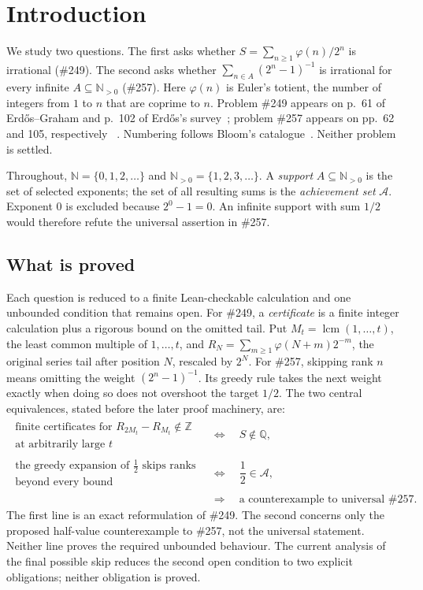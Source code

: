 \documentclass[11pt]{article}
\theoremstyle{definition}
\theoremstyle{remark}
\newcommand{\N}{\mathbb{N}}
\newcommand{\Npos}{\mathbb{N}_{>0}}
\newcommand{\Z}{\mathbb{Z}}
\newcommand{\Q}{\mathbb{Q}}
\newcommand{\ph}{\varphi}
\newcommand{\lcm}{\operatorname{lcm}}
\begin{document}
\section{Introduction}\label{sec:intro}

We study two questions.  The first asks whether
$S=\sum_{n\ge1}\ph(n)/2^n$ is irrational (\#249).  The second asks whether
$\sum_{n\in A}(2^n-1)^{-1}$ is irrational
for every infinite $A\subseteq\Npos$ (\#257).
Here \(\ph(n)\) is Euler's totient, the number
of integers from \(1\) to \(n\) that are coprime to \(n\).  Problem \#249
appears on p.~61 of Erd\H{o}s--Graham and p.~102 of Erd\H{o}s's
survey~\cite[p.~61]{erdosgraham1980}\cite[p.~102]{erdos1988}; problem
\#257 appears on pp.~62 and 105, respectively~\cite[p.~62]{erdosgraham1980}
\cite[p.~105]{erdos1988}.  Numbering follows Bloom's
catalogue~\cite{erdosproblems}.  Neither problem is settled.

Throughout, \(\N=\{0,1,2,\ldots\}\) and
\(\Npos=\{1,2,3,\ldots\}\).  A \emph{support} \(A\subseteq\Npos\)
is the set of selected exponents; the set of all resulting sums is the
\emph{achievement set} \(\mathcal A\).  Exponent \(0\) is excluded because
\(2^0-1=0\).  An infinite support with sum \(1/2\) would therefore refute
the universal assertion in \#257.

\subsection*{What is proved}

Each question is reduced to a finite Lean-checkable calculation and one
unbounded condition that remains open.  For \#249, a \emph{certificate} is a
finite integer calculation plus a rigorous bound on the omitted tail.  Put
\(M_t=\lcm(1,\ldots,t)\), the least common multiple of \(1,\ldots,t\), and
\(R_N=\sum_{m\geq1}\ph(N+m)2^{-m}\), the original series tail after
position \(N\), rescaled by \(2^N\).  For \#257, skipping rank \(n\) means
omitting the weight \((2^n-1)^{-1}\).  Its greedy rule takes the next weight
exactly when doing so does not overshoot the target \(1/2\).
\noindent The two central equivalences, stated before the later proof
machinery, are:
\[
 \begin{aligned}
 \substack{\text{finite certificates for }R_{2M_t}-R_{M_t}\notin\Z\\
   \text{at arbitrarily large }t}
 &\quad\Longleftrightarrow\quad S\notin\Q,\\[4pt]
 \substack{\text{the greedy expansion of }\tfrac12\text{ skips ranks}\\
   \text{beyond every bound}}
 &\quad\Longleftrightarrow\quad \dfrac12\in\mathcal A,\\[-1pt]
 &\quad\Longrightarrow\quad \text{a counterexample to universal \#257}.
 \end{aligned}
\]
The first line is an exact reformulation of \#249.  The second concerns only
the proposed half-value counterexample to \#257, not the universal statement.
Neither line proves the required unbounded behaviour.  The current analysis
of the final possible skip reduces the second open condition to two explicit
obligations; neither obligation is proved.
\end{document}
